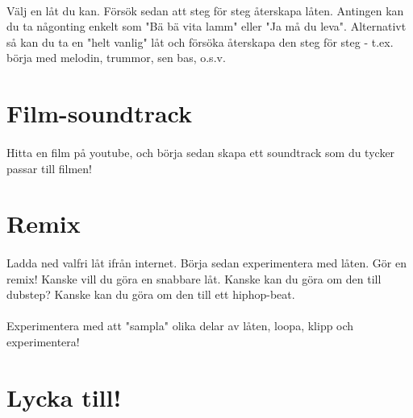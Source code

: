 \documentclass{article}
\begin{document}
    \paragraph{}
    Välj en låt du kan. Försök sedan att steg för steg återskapa låten. Antingen kan du ta någonting enkelt som "Bä bä vita lamm" eller "Ja må du leva". Alternativt så kan du ta en "helt vanlig" låt och försöka återskapa den steg för steg - t.ex. börja med melodin, trummor, sen bas, o.s.v.



  \section{ Film-soundtrack }
    \paragraph{}
    Hitta en film på youtube, och börja sedan skapa ett soundtrack som du tycker passar till filmen!



  \section{ Remix }
    \paragraph{}
    Ladda ned valfri låt ifrån internet. Börja sedan experimentera med låten. Gör en remix! Kanske vill du göra en snabbare låt. Kanske kan du göra om den till dubstep? Kanske kan du göra om den till ett hiphop-beat.
    \paragraph{}
    Experimentera med att "sampla" olika delar av låten, loopa, klipp och experimentera!


  \section*{ Lycka till! }
\end{document}
